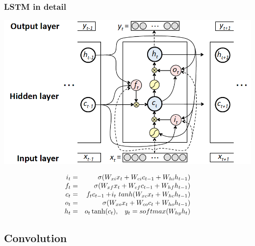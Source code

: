 \begin{frame}
\frametitle{LSTM in detail \cite{gers02peephole}}

\centerline{\includegraphics[scale=0.28]{figs/lstm_detailschematic}}
\vspace{-0.4cm}
\begin{eqnarray*}
  i_{t} &=&  \sigma (W_{xi} x_{t} + W_{ci} c_{t-1} + W_{hi} h_{t-1}) \\[-.25em]
  f_{t} &=&  \sigma (W_{xf} x_{t} + W_{cf} c_{t-1} + W_{hf} h_{t-1}) \\[-.25em]
  c_{t} &=&  f_{t} c_{t-1} + \!i_{t} \ tanh (W_{xc} x_{t} + W_{hc} h_{t-1}) \\[-.25em]
  o_{t} &=&  \sigma (W_{xo} x_{t} + W_{co} c_{t} + W_{ho} h_{t-1}) \\[-.25em]
  h_{t} &=&  o_{t} \tanh(c_{t}), \hspace{0.3cm}  y_{t} =  softmax(W_{hy} h_{t})
\end{eqnarray*}
\vspace{-0.2cm}

\end{frame}




\subsection[Convolution]{Convolution} 

